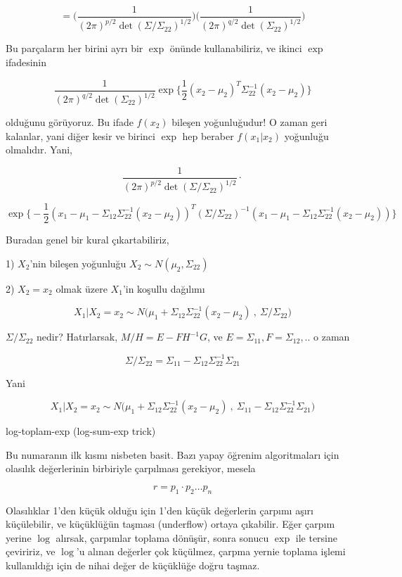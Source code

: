 \documentclass[12pt,fleqn]{article}\usepackage{../../common}
\begin{document}
$$ =
\bigg( \frac{ 1}{(2\pi)^{p/2} \det(\Sigma/\Sigma_{22})^{1/2}} \bigg)
\bigg( \frac{ 1}{(2\pi)^{q/2} \det(\Sigma_{22})^{1/2}} \bigg)
$$

Bu parçaların her birini ayrı bir $\exp$ önünde kullanabiliriz, ve ikinci $\exp$
ifadesinin 

$$ 
\frac{ 1}{(2\pi)^{q/2} \det(\Sigma_{22})^{1/2}}
\exp \bigg\{
\frac{ 1}{2}(x_2-\mu_2)^T\Sigma_{22}^{-1} (x_2-\mu_2)
 \bigg\}
$$


olduğunu görüyoruz. Bu ifade $f(x_2)$ bileşen yoğunluğudur! O zaman geri
kalanlar, yani diğer kesir ve birinci $\exp$ hep beraber $f(x_1|x_2)$
yoğunluğu olmalıdır. Yani,

$$ 
\frac{ 1}{(2\pi)^{p/2} \det(\Sigma/\Sigma_{22})^{1/2}} \cdot
$$

$$ 
\exp \bigg\{
-\frac{1 }{2} 
(x_1 - \mu_1 - \Sigma_{12}\Sigma_{22}^{-1} (x_2 - \mu_2))^T 
(\Sigma/\Sigma_{22})^{-1} 
(x_1 - \mu_1 - \Sigma_{12}\Sigma_{22}^{-1} (x_2 - \mu_2))
\bigg\}
$$

Buradan genel bir kural çıkartabiliriz, 

1) $X_2$'nin bileşen yoğunluğu $X_2 \sim N(\mu_2, \Sigma_{22})$

2) $X_2 = x_2$ olmak üzere $X_1$'in koşullu dağılımı 

$$
X_1 | X_2 = x_2 \sim 
N\bigg(\mu_1 + \Sigma_{12}\Sigma_{22}^{-1} (x_2 -\mu_2) \ , \
\Sigma/\Sigma_{22} \bigg)
$$

$\Sigma/\Sigma_{22}$ nedir? Hatırlarsak, $M/H = E-FH^{-1}G$, ve 
$E = \Sigma_{11},F=\Sigma_{12},..$ o zaman 

$$ \Sigma/\Sigma_{22} = \Sigma_{11}-\Sigma_{12} \Sigma_{22}^{-1} \Sigma_{21} $$

Yani

$$ X_1 | X_2 = x_2 \sim 
N\bigg(\mu_1 + \Sigma_{12}\Sigma_{22}^{-1} (x_2 -\mu_2) \ , \
\Sigma_{11}-\Sigma_{12} \Sigma_{22}^{-1} \Sigma_{21}
\bigg)
$$ 

log-toplam-exp (log-sum-exp trick)

Bu numaranın ilk kısmı nisbeten basit. Bazı yapay öğrenim algoritmaları için
olasılık değerlerinin birbiriyle çarpılması gerekiyor, mesela 

$$ r = p_1 \cdot p_2 \dots p_n $$

Olasılıklar 1'den küçük olduğu için 1'den küçük değerlerin çarpımı aşırı
küçülebilir, ve küçüklüğün taşması (underflow) ortaya çıkabilir. Eğer
çarpım yerine $\log$ alırsak, çarpımlar toplama dönüşür, sonra sonucu
$\exp$ ile tersine çeviririz, ve $\log$'u alınan değerler çok küçülmez,
çarpma yernie toplama işlemi kullanıldığı için de nihai değer de küçüklüğe
doğru taşmaz.
\end{document}
